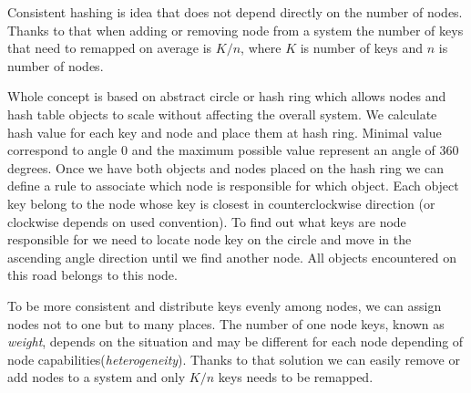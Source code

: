   Consistent hashing is idea that does not depend directly on the number of nodes. Thanks to that when adding or removing
  node from a system the number of keys that need to remapped on average is $ K/n $, where $K$ is number of keys and $n$
  is number of nodes.

  Whole concept is based on abstract circle or hash ring which allows nodes and hash table objects to scale without affecting
  the overall system. We calculate hash value for each key and node and place them at hash ring. Minimal value correspond to
  angle 0 and the maximum possible value represent an angle of 360 degrees.
  Once we have both objects and nodes placed on the hash ring we can define a rule to associate which node is responsible for
  which object. Each object key belong to the node whose key is closest in counterclockwise direction (or clockwise depends on
  used convention). To find out what keys are node responsible for we need to locate node key on the circle and move in the
  ascending angle direction until we find another node. All objects encountered on this road belongs to this node.

  To be more consistent and distribute keys evenly among nodes, we can assign nodes not to one but to many places.
  The number of one node keys, known as \textit{weight}, depends on the situation and may be different for each node
  depending of node capabilities(\textit{heterogeneity}). Thanks to that solution we can easily remove or add nodes
  to a system and only $ K/n $ keys needs to be remapped.

